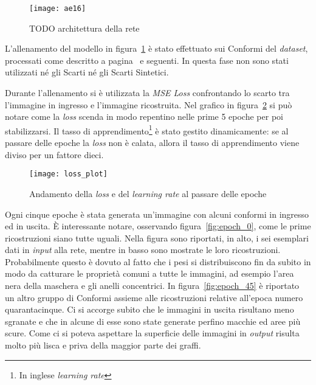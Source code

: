 \begin{figure}[ht]
  \begin{center}
    \texttt{[image: ae16]}
    \caption{TODO architettura della rete}
    \label{fig:ae16_arch}
  \end{center}
\end{figure}

L'allenamento del modello in figura~\ref{fig:ae16_arch} è stato effettuato sui Conformi del \textit{dataset}, processati come descritto a pagina~\pageref{prep} e seguenti.
In questa fase non sono stati utilizzati né gli Scarti né gli Scarti Sintetici.

Durante l'allenamento si è utilizzata la \textit{MSE Loss} confrontando lo scarto tra l'immagine in ingresso e l'immagine ricostruita.
Nel grafico in figura~\ref{fig:loss_plot} si può notare come la \textit{loss} scenda in modo repentino nelle prime 5 epoche per poi stabilizzarsi.
Il tasso di apprendimento\footnote{In inglese \textit{learning rate}} è stato gestito dinamicamente: se al passare delle epoche la \textit{loss} non è calata, allora il tasso di apprendimento viene diviso per un fattore dieci.

\begin{figure}[ht] %
  \begin{center}
    \texttt{[image: loss\_plot]}
    \caption{Andamento della \textit{loss} e del \textit{learning rate} al passare delle epoche}
    \label{fig:loss_plot}
  \end{center}
\end{figure}

Ogni cinque epoche è stata generata un'immagine con alcuni conformi in ingresso  ed in uscita.
È interessante notare, osservando figura~\ref{fig:epoch_0}, come le prime ricostruzioni siano tutte uguali.
Nella figura sono riportati, in alto, i sei esemplari dati in \textit{input} alla rete, mentre in basso sono mostrate le loro ricostruzioni.
Probabilmente questo è dovuto al fatto che i pesi si distribuiscono fin da subito in modo da catturare le proprietà comuni a tutte le immagini, ad esempio l'area nera della maschera e gli anelli concentrici.
In figura~\ref{fig:epoch_45} è riportato un altro gruppo di Conformi assieme alle ricostruzioni relative all'epoca numero quarantacinque.
Ci si accorge subito che le immagini in uscita risultano meno sgranate e che in alcune di esse sono state generate perfino macchie ed aree più scure.
Come ci si poteva aspettare la superficie delle immagini in \textit{output} risulta molto più lisca e priva della maggior parte dei graffi.

